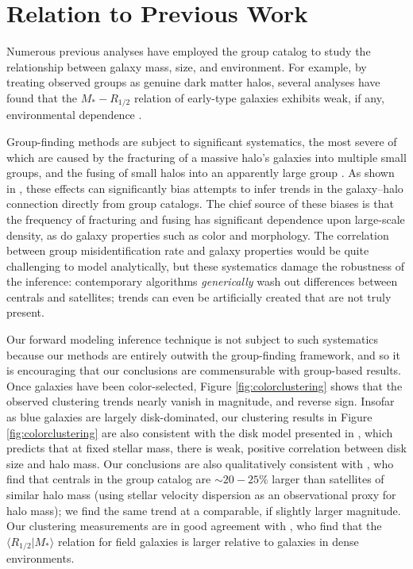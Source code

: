 \documentclass[usenatbib,usegraphicx,letterpaper]{mn2e}
\newcommand{\rhalf}{R_{1/2}}
\newcommand{\mstar}{M_{\ast}}
\newcommand{\mean}[2]{\langle{#1}\vert{#2}\rangle}
\begin{document}
\section{Relation to Previous Work}
\label{sec:previous_work}

Numerous previous analyses have employed the \citet{yang_etal05b} group catalog to study the relationship between galaxy mass, size, and environment. For example, by treating observed groups as genuine dark matter halos, several analyses have found that the $\mstar-\rhalf$ relation of early-type galaxies exhibits weak, if any, environmental dependence \citep{weinmann_etal08,huertas_company_etal13b,shankar_etal14}.


Group-finding methods are subject to significant systematics, the most severe of which are caused by the fracturing of a massive halo's galaxies into multiple small groups, and the fusing of small halos into an apparently large group \citep{duarte_mamon14}. As shown in \citet{campbell_etal15}, these effects can significantly bias attempts to infer trends in the galaxy--halo connection directly from group catalogs. The chief source of these  biases is that the frequency of fracturing and fusing has significant dependence upon large-scale density, as do galaxy properties such as color and morphology. The correlation between group misidentification rate and galaxy properties would be quite challenging to model analytically, but these systematics damage the robustness of the inference: contemporary algorithms {\em generically} wash out differences between centrals and satellites; trends can even be artificially created that are not truly present. 

 Our forward modeling inference technique is not subject to such systematics because our methods are entirely outwith the group-finding framework, and so it is encouraging that our conclusions are commensurable with group-based results. Once galaxies have been color-selected, Figure \ref{fig:colorclustering} shows that the observed clustering trends nearly vanish in magnitude, and reverse sign. Insofar as blue galaxies are largely disk-dominated, our clustering results in Figure \ref{fig:colorclustering} are also consistent with the disk model presented in \citet{dutton_etal08,dutton_etal10}, which predicts that at fixed stellar mass, there is weak, positive correlation between disk size and halo mass. Our conclusions are also qualitatively consistent with \citet{spindler_wake17}, who find that centrals in the \citet{yang_etal05a} group catalog are $\sim20-25\%$ larger than satellites of similar halo mass (using stellar velocity dispersion as an observational proxy for halo mass); we find the same trend at a comparable, if slightly larger magnitude. Our clustering measurements are in good agreement with \citet{cebrian_trujillo14}, who find that the $\mean{\rhalf}{\mstar}$ relation for field galaxies is larger relative to galaxies in dense environments. 
\end{document}
